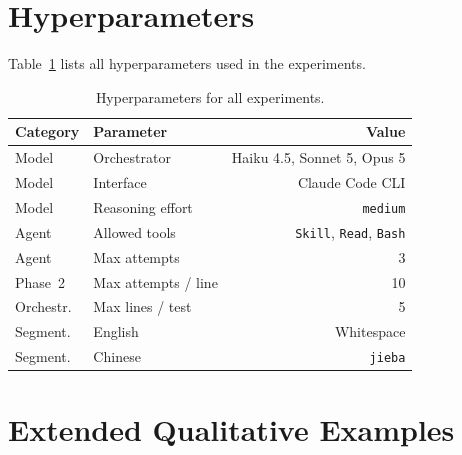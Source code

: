 \documentclass[11pt]{article}
\begin{document}
\section{Hyperparameters}
\label{app:hyperparams}

Table~\ref{tab:hyperparams} lists all hyperparameters used in the experiments.

\begin{table}[h]
\centering
\small
\setlength{\tabcolsep}{2pt}
\begin{tabular}{@{}llr@{}}
\toprule
\textbf{Category} & \textbf{Parameter} & \textbf{Value} \\
\midrule
Model & Orchestrator & Haiku 4.5, Sonnet 5, Opus 5 \\
Model & Interface & Claude Code CLI \\
Model & Reasoning effort & \texttt{medium} \\
\midrule
Agent & Allowed tools & \texttt{Skill}, \texttt{Read}, \texttt{Bash} \\
Agent & Max attempts & 3 \\
\midrule
Phase~2 & Max attempts / line & 10 \\
\midrule
Orchestr. & Max lines / test & 5 \\
\midrule
Segment. & English & Whitespace \\
Segment. & Chinese & \texttt{jieba} \\
\bottomrule
\end{tabular}
\caption{Hyperparameters for all experiments.}
\label{tab:hyperparams}
\end{table}

\section{Extended Qualitative Examples}
\label{app:examples}
\end{document}
